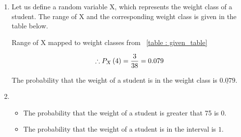 \documentclass[journal,12pt,twocolumn]{IEEEtran}
\begin{document}
	\begin{enumerate}[label = \brak{\textbf{\roman*}}]
	\item
	
	Let us define a random variable X, which represents the weight class of a student. The range of X and the corresponding weight class is given in the table below.
	
	\begin{table}[h!tb]
	
		\centering
		
		\caption{Range of X mapped to weight classes from ~\ref{table : given_table}}
		
		
		
		\label{table : range_table}
		
	\end{table}
	
	
	\begin{align}
		\therefore P_X \left(4\right) = \frac{3}{38} = 0.079
	\end{align}
	
	
	The probability that the weight of a student is in the weight class  is $\underline{0.079}.$ 
		
	
	\item
	
	\begin{itemize}
	
		\item The probability that the weight of a student is greater that 75 is $0$.
		
		\item The probability that the weight of a student is in the interval  is $1$.
	
	\end{itemize}
	
	\end{enumerate}
	
\end{document}
